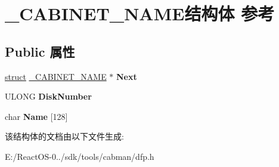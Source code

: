 \hypertarget{struct___c_a_b_i_n_e_t___n_a_m_e}{}\section{\+\_\+\+C\+A\+B\+I\+N\+E\+T\+\_\+\+N\+A\+M\+E结构体 参考}
\label{struct___c_a_b_i_n_e_t___n_a_m_e}
\subsection*{Public 属性}
\begin{DoxyCompactItemize}
\item 
\mbox{\label{struct___c_a_b_i_n_e_t___n_a_m_e_a7a269f10c11a3395c8b5c8e910991efd}} 
\hyperlink{interfacestruct}{struct} \hyperlink{struct___c_a_b_i_n_e_t___n_a_m_e}{\+\_\+\+C\+A\+B\+I\+N\+E\+T\+\_\+\+N\+A\+ME} $\ast$ {\bfseries Next}
\item 
\mbox{\label{struct___c_a_b_i_n_e_t___n_a_m_e_ad8dd08555f1a12853d9d910add4edea9}} 
U\+L\+O\+NG {\bfseries Disk\+Number}
\item 
\mbox{\label{struct___c_a_b_i_n_e_t___n_a_m_e_a7b09bde5affce411bf4eba3046a2468b}} 
char {\bfseries Name} \mbox{[}128\mbox{]}
\end{DoxyCompactItemize}


该结构体的文档由以下文件生成\+:\begin{DoxyCompactItemize}
\item 
E\+:/\+React\+O\+S-\/0../sdk/tools/cabman/dfp.\+h\end{DoxyCompactItemize}
